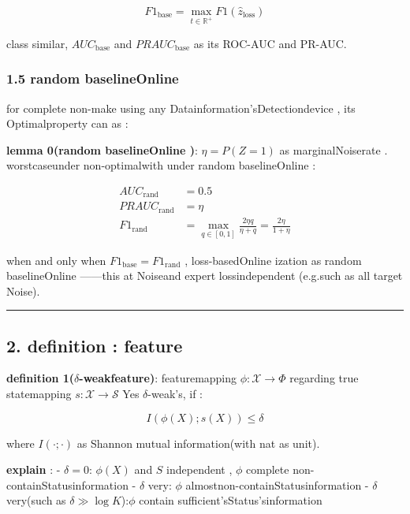 \documentclass[
  12pt,
]{article}
\begin{document}
\[F1_{\text{base}} = \max_{t \in \mathbb{R}^+} F1\left(\hat{z}_{\text{loss}}\right)\]

class similar, \(AUC_{\text{base}}\) and  \(PRAUC_{\text{base}}\) as its 
ROC-AUC and  PR-AUC. 

\subsubsection{1.5 random baselineOnline }\label{ux968fux673aux57faux7ebf}

for complete non-make using any Datainformation'sDetectiondevice , its Optimalproperty can as : 

\textbf{lemma  0(random baselineOnline )}:  \(\eta = P(Z = 1)\)
as marginalNoiserate . worstcaseunder non-optimalwith under random baselineOnline : 

\[\begin{aligned}
AUC_{\text{rand}} &= 0.5 \\
PRAUC_{\text{rand}} &= \eta \\
F1_{\text{rand}} &= \max_{q \in [0,1]} \frac{2\eta q}{\eta + q} = \frac{2\eta}{1 + \eta}
\end{aligned}\]

when and only when  \(F1_{\text{base}} = F1_{\text{rand}}\)
, loss-basedOnline ization as random baselineOnline ------this at Noiseand expert lossindependent (e.g.such as all target Noise). 

\begin{center}\rule{0.5\linewidth}{0.5pt}\end{center}

\subsection{2. definition : feature}\label{ux5b9aux4e49ux5f31ux7279ux5f81}

\textbf{definition  1(\(\delta\)-weakfeature)}: featuremapping
\(\phi: \mathcal{X} \to \Phi\) regarding true statemapping
\(s: \mathcal{X} \to \mathcal{S}\) Yes \(\delta\)-weak's, if : 

\[I(\phi(X); s(X)) \leq \delta\]

where \(I(\cdot; \cdot)\) as  Shannon mutual information(with  nat as unit). 

\textbf{explain }:  - \(\delta = 0\): \(\phi(X)\) and  \(S\) independent , \(\phi\)
complete non-containStatusinformation - \(\delta\) very: \(\phi\) almostnon-containStatusinformation -
\(\delta\) very(such as  \(\delta \gg \log K\)):\(\phi\)
contain sufficient'sStatus'sinformation
\end{document}
